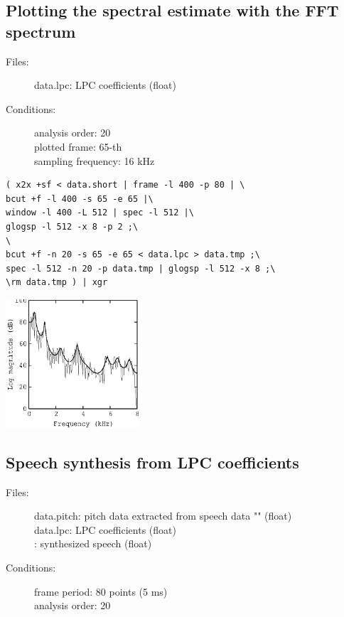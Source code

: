 \documentclass[a4paper,10pt]{article}
\begin{document}
\subsection{Plotting the spectral estimate with the FFT spectrum}

\begin{description}
\item[Files:]
  data.lpc: LPC coefficients (float)
\item[Conditions:]
  analysis order: 20\\
  plotted frame: 65-th\\
  sampling frequency: 16 kHz
\end{description}

\begin{verbatim}
( x2x +sf < data.short | frame -l 400 -p 80 | \
bcut +f -l 400 -s 65 -e 65 |\
window -l 400 -L 512 | spec -l 512 |\
glogsp -l 512 -x 8 -p 2 ;\
\
bcut +f -n 20 -s 65 -e 65 < data.lpc > data.tmp ;\
spec -l 512 -n 20 -p data.tmp | glogsp -l 512 -x 8 ;\
\rm data.tmp ) | xgr
\end{verbatim}

\includegraphics[width=5cm]{eps/data.lpc.glogsp.eps}

\subsection{Speech synthesis from LPC coefficients}

\begin{description}
\item[Files:]
   data.pitch: pitch data extracted from speech data
           ""
           (float)\\
   data.lpc: LPC coefficients (float)\\
: 
   synthesized speech (float)
\item[Conditions:]
  frame period: 80 points (5 ms)\\
  analysis order: 20
\end{description}
\end{document}
